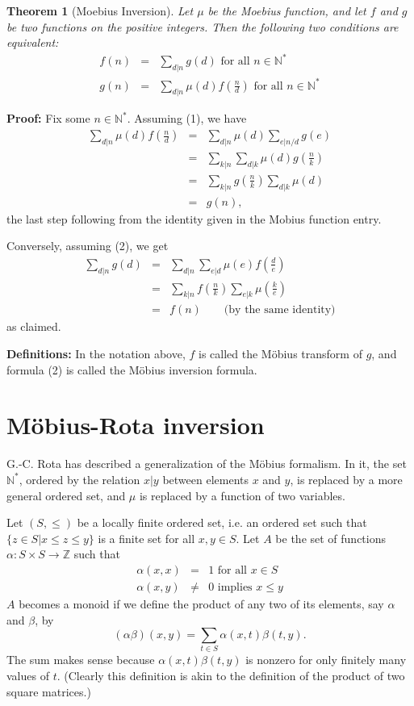 \documentclass[12pt]{article}
\newtheorem{Theo}{Theorem}
\newcommand{\Z}{\mathbb{Z}}
\newcommand{\Nstar}{\mathbb{N}^{*}}
\begin{document}
 
 

\begin{Theo}[Moebius Inversion]
Let $\mu$ be the Moebius function, and let $f$ and $g$ be two functions on the positive integers.  Then the following two conditions are equivalent:
\begin{eqnarray}
f(n)&=&\sum_{d|n}g(d)\textrm{ for all }n\in\Nstar \\
g(n)&=&\sum_{d|n}\mu(d)f\left(\frac{n}{d}\right)\textrm{ for all }n\in\Nstar
\end{eqnarray}
\end{Theo}

\noindent
\textbf{Proof:} Fix some $n\in\Nstar$. Assuming (1), we have
\begin{eqnarray*}
\sum_{d|n}\mu(d)f\left(\frac{n}{d}\right)
&=&\sum_{d|n}\mu(d)\sum_{e|n/d}g(e) \\
&=&\sum_{k|n}\sum_{d|k}\mu(d)g\left(\frac{n}{k}\right) \\
&=&\sum_{k|n}g\left(\frac{n}{k}\right)\sum_{d|k}\mu(d) \\
&=&g(n),
\end{eqnarray*}
the last step following from the identity given in the Mobius function entry.

Conversely, assuming (2), we get
\begin{eqnarray*}
\sum_{d|n}g(d)
&=&\sum_{d|n}\sum_{e|d}\mu(e)f\left(\frac{d}{e}\right) \\
&=&\sum_{k|n}f\left(\frac{n}{k}\right)\sum_{e|k}\mu\left(\frac{k}{e}\right) \\
&=&f(n)\qquad\text{(by the same identity)}
\end{eqnarray*}
as claimed.

\textbf{Definitions: }
In the notation above, $f$ is called the M\"obius transform
of $g$, and formula (2) is called the M\"obius inversion formula.

\section*{M\"obius-Rota inversion}
G.-C. Rota has described a generalization of the M\"obius formalism.
In it, the set $\Nstar$, ordered by the relation $x|y$ between elements
$x$ and $y$, is replaced by a more general ordered set, and $\mu$
is replaced by a function of two variables.

Let $(S,\le)$ be a locally finite ordered set, i.e. an ordered set such that
$\{z\in S|x\le z\le y\}$ is a finite set for all $x,y\in S$. Let $A$ be the set
of functions $\alpha:S\times S\to\Z$ such that
\begin{eqnarray}
\alpha(x,x)&=&1\textrm{ for all }x\in S \\
\alpha(x,y)&\neq&0\textrm{ implies }x\leq y
\end{eqnarray}
$A$ becomes a monoid if we define the product of any two of its
elements, say $\alpha$ and $\beta$, by
$$(\alpha\beta)(x,y)=\sum_{t\in S}\alpha(x,t)\beta(t,y).$$
The sum makes sense because $\alpha(x,t)\beta(t,y)$ is nonzero
for only finitely many values of $t$.
(Clearly this definition is akin to the definition of the product
of two square matrices.)
\end{document}
